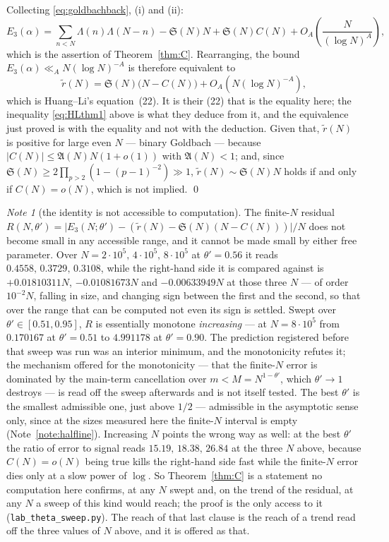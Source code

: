 \documentclass[11pt,a4paper]{article}
\theoremstyle{plain}
\theoremstyle{definition}
\theoremstyle{remark}
\newtheorem{note}[theorem]{Note}
\renewcommand{\SS}{\mathfrak{S}}
\newcommand{\AAA}{\mathfrak{A}}
\begin{document}
\medskip
Collecting \eqref{eq:goldbachback}, (i) and (ii):
\[
  E_3(\alpha)=\sum_{n<N}\Lambda(n)\Lambda(N-n)
    -\SS(N)N+\SS(N)C(N)+O_A\!\left(\frac{N}{(\log N)^{A}}\right),
\]
which is the assertion of Theorem~\ref{thm:C}. Rearranging, the bound
$E_3(\alpha)\ll_A N(\log N)^{-A}$ is therefore equivalent to
\[
  \tilde r(N)=\SS(N)\bigl(N-C(N)\bigr)+O_A\!\left(N(\log N)^{-A}\right),
\]
which is Huang--Li's equation~(22). It is their (22) that is the
equality here; the inequality \eqref{eq:HLthm1} above is what they
deduce from it, and the equivalence just proved is with the equality
and not with the deduction. Given that, $\tilde r(N)$ is
positive for large even $N$ --- binary Goldbach --- because
$|C(N)|\le\AAA(N)N(1+o(1))$ with $\AAA(N)<1$; and, since
$\SS(N)\ge2\prod_{p>2}(1-(p-1)^{-2})\gg1$,
$\tilde r(N)\sim\SS(N)N$ holds if and only if $C(N)=o(N)$, which is
not implied. \qed

\begin{note}[the identity is not accessible to computation]%
\label{note:thetasweep}
The finite-$N$ residual
$R(N,\theta')=\bigl|E_3(N;\theta')-(\tilde r(N)-\SS(N)(N-C(N)))\bigr|/N$
does not become small in any accessible range, and it cannot be made
small by either free parameter. Over
$N=2\cdot10^5,\,4\cdot10^5,\,8\cdot10^5$ at $\theta'=0.56$ it reads
$0.4558,\,0.3729,\,0.3108$, while the right-hand side it is compared
against is $+0.01810311N$, $-0.01081673N$ and $-0.00633949N$ at those
three $N$ --- of order $10^{-2}N$, falling in size, and changing sign
between the first and the second, so that over the range that can be
computed not even its sign is settled. Swept over $\theta'\in[0.51,0.95]$, $R$
is essentially monotone \emph{increasing} --- at $N=8\cdot10^5$ from
$0.170167$ at $\theta'=0.51$ to $4.991178$ at $\theta'=0.90$. The
prediction registered before that sweep was run was an interior
minimum, and the monotonicity refutes it; the mechanism offered for the
monotonicity --- that the finite-$N$ error is dominated by the
main-term cancellation over $m<M=N^{1-\theta'}$, which $\theta'\to1$
destroys --- is read off the sweep afterwards and is not itself
tested.
The best $\theta'$ is the smallest admissible one, just above $1/2$ ---
admissible in the asymptotic sense only, since at the sizes measured
here the finite-$N$ interval is empty (Note~\ref{note:halfline}).
Increasing $N$ points the wrong way as well: at the best $\theta'$ the
ratio of error to signal reads $15.19,\,18.38,\,26.84$ at the three
$N$ above, because $C(N)=o(N)$ being true kills the right-hand side
fast while the finite-$N$ error dies only at a slow power of $\log$.
So Theorem~\ref{thm:C} is a statement no computation here confirms, at
any $N$ swept and, on the trend of the residual, at any $N$ a sweep of
this kind would reach; the proof is the only access to it
(\texttt{lab\_theta\_sweep.py}). The reach of that last clause is the
reach of a trend read off the three values of $N$ above, and it is
offered as
that.
\end{note}
\end{document}
